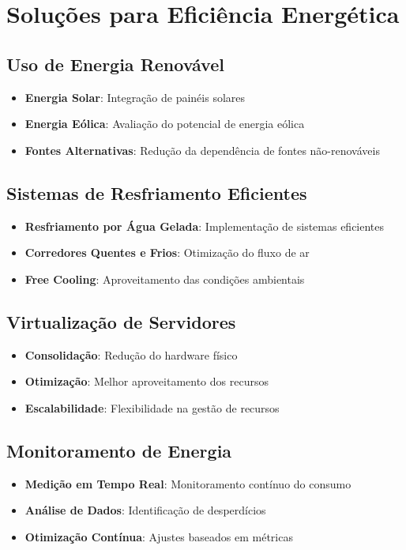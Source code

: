 \documentclass[
	12pt,				%
	oneside,			%
	a4paper,			%
	english,			%
	brazil				%
	]{abntex2unama}
\begin{document}
\chapter{Soluções para Eficiência Energética}

\section{Uso de Energia Renovável}
\begin{itemize}
	\item \textbf{Energia Solar}: Integração de painéis solares
	\item \textbf{Energia Eólica}: Avaliação do potencial de energia eólica
	\item \textbf{Fontes Alternativas}: Redução da dependência de fontes não-renováveis
\end{itemize}

\section{Sistemas de Resfriamento Eficientes}
\begin{itemize}
	\item \textbf{Resfriamento por Água Gelada}: Implementação de sistemas eficientes
	\item \textbf{Corredores Quentes e Frios}: Otimização do fluxo de ar
	\item \textbf{Free Cooling}: Aproveitamento das condições ambientais
\end{itemize}

\section{Virtualização de Servidores}
\begin{itemize}
	\item \textbf{Consolidação}: Redução do hardware físico
	\item \textbf{Otimização}: Melhor aproveitamento dos recursos
	\item \textbf{Escalabilidade}: Flexibilidade na gestão de recursos
\end{itemize}

\section{Monitoramento de Energia}
\begin{itemize}
	\item \textbf{Medição em Tempo Real}: Monitoramento contínuo do consumo
	\item \textbf{Análise de Dados}: Identificação de desperdícios
	\item \textbf{Otimização Contínua}: Ajustes baseados em métricas
\end{itemize}
\end{document}
